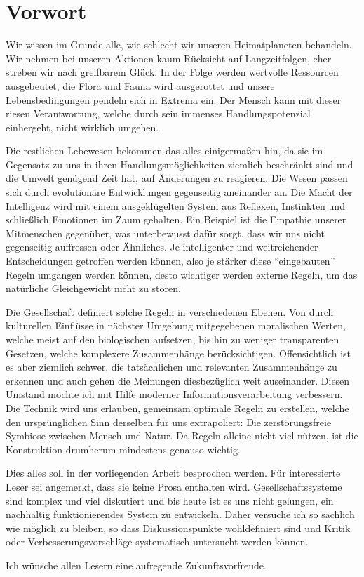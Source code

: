 \chapter{Vorwort}\label{chap:prologue}

Wir wissen im Grunde alle, wie schlecht wir unseren Heimatplaneten behandeln. Wir nehmen bei unseren Aktionen kaum Rücksicht auf Langzeitfolgen, eher streben wir nach greifbarem Glück. In der Folge werden wertvolle Ressourcen ausgebeutet, die Flora und Fauna wird ausgerottet und unsere Lebensbedingungen pendeln sich in Extrema ein. Der Mensch kann mit dieser riesen Verantwortung, welche durch sein immenses Handlungspotenzial einhergeht, nicht wirklich umgehen.

Die restlichen Lebewesen bekommen das alles einigermaßen hin, da sie im Gegensatz zu uns in ihren Handlungsmöglichkeiten ziemlich beschränkt sind und die Umwelt genügend Zeit hat, auf Änderungen zu reagieren. Die Wesen passen sich durch evolutionäre Entwicklungen gegenseitig aneinander an. Die Macht der Intelligenz wird mit einem ausgeklügelten System aus Reflexen, Instinkten und schließlich Emotionen im Zaum gehalten. Ein Beispiel ist die Empathie unserer Mitmenschen gegenüber, was unterbewusst dafür sorgt, dass wir uns nicht gegenseitig auffressen oder Ähnliches. Je intelligenter und weitreichender Entscheidungen getroffen werden können, also je stärker diese "`eingebauten"' Regeln umgangen werden können, desto wichtiger werden externe Regeln, um das natürliche Gleichgewicht nicht zu stören.

Die Gesellschaft definiert solche Regeln in verschiedenen Ebenen. Von durch kulturellen Einflüsse in nächster Umgebung mitgegebenen moralischen Werten, welche meist auf den biologischen aufsetzen, bis hin zu weniger transparenten Gesetzen, welche komplexere Zusammenhänge berücksichtigen. Offensichtlich ist es aber ziemlich schwer, die tatsächlichen und relevanten Zusammenhänge zu erkennen und auch gehen die Meinungen diesbezüglich weit auseinander. Diesen Umstand möchte ich mit Hilfe moderner Informationsverarbeitung verbessern. Die Technik wird uns erlauben, gemeinsam optimale Regeln zu erstellen, welche den ursprünglichen Sinn derselben für uns extrapoliert: Die zerstörungsfreie Symbiose zwischen Mensch und Natur. Da Regeln alleine nicht viel nützen, ist die Konstruktion drumherum mindestens genauso wichtig.

Dies alles soll in der vorliegenden Arbeit besprochen werden. Für interessierte Leser sei angemerkt, dass sie keine Prosa enthalten wird. Gesellschaftssysteme sind komplex und viel diskutiert und bis heute ist es uns nicht gelungen, ein nachhaltig funktionierendes System zu entwickeln. Daher versuche ich so sachlich wie möglich zu bleiben, so dass Diskussionspunkte wohldefiniert sind und Kritik oder Verbesserungsvorschläge systematisch untersucht werden können.

Ich wünsche allen Lesern eine aufregende Zukunftsvorfreude.